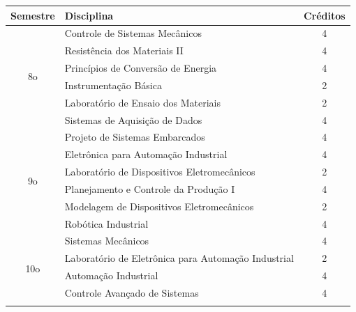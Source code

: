 \documentclass[12pt]{article} %
\begin{document}
\begin{table}[H]
\centering
\begin{tabular}{|c|l|c|}
\hline
Semestre             & Disciplina                                                 & Créditos \\ \hline
\multirow{6}{*}{8o}  & Controle de Sistemas Mecânicos                             & 4        \\ \cline{2-3} 
                     & Resistência dos Materiais II                               & 4        \\ \cline{2-3} 
                     & Princípios de Conversão de Energia                         & 4        \\ \cline{2-3} 
                     & Instrumentação Básica                                      & 2        \\ \cline{2-3} 
                     & Laboratório de Ensaio dos Materiais                        & 2        \\ \cline{2-3} 
                     & Sistemas de Aquisição de Dados                             & 4        \\ \hline
\multirow{6}{*}{9o}  & Projeto de Sistemas Embarcados                             & 4        \\ \cline{2-3} 
                     & Eletrônica para Automação Industrial                       & 4        \\ \cline{2-3} 
                     & Laboratório de Dispositivos Eletromecânicos                & 2        \\ \cline{2-3} 
                     & Planejamento e Controle da Produção I                      & 4        \\ \cline{2-3} 
                     & Modelagem de Dispositivos Eletromecânicos                  & 2        \\ \cline{2-3} 
                     & Robótica Industrial                                        & 4        \\ \hline
\multirow{5}{*}{10o} & Sistemas Mecânicos                                         & 4        \\ \cline{2-3} 
                     & Laboratório de Eletrônica para Automação Industrial        & 2        \\ \cline{2-3} 
                     & Automação Industrial                                       & 4        \\ \cline{2-3} 
                     & Controle Avançado de Sistemas                              & 4        \\ \cline{2-3} 

\end{tabular}
\end{table}
\end{document}
